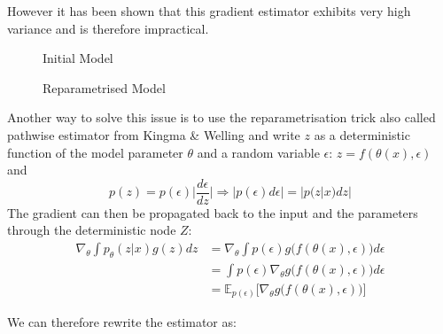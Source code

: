 \documentclass[10pt,oneside,openright]{report}
\begin{document}
However it has been shown that this gradient estimator exhibits very high variance and is therefore impractical.

\begin{figure}[H]
    \centering
    \begin{minipage}{0.45\textwidth}
        \centering
{}
        \caption{Initial Model}
    \end{minipage}\hfill
    \begin{minipage}{0.45\textwidth}
        \centering
{}
        \caption{Reparametrised Model}
    \end{minipage}
\end{figure}

Another way to solve this issue is to use the reparametrisation trick also called pathwise estimator  from Kingma \& Welling \cite{kingma} and write $z$ as a deterministic function of the model parameter $\theta$ and a random variable $\epsilon$: $z = f(\theta(x), \epsilon)$ and
$$p(z) = p(\epsilon) \Big|\frac{d\epsilon}{dz} \Big| \Rightarrow |p(\epsilon) d\epsilon| = |p(z|x) dz|$$
The gradient can then be propagated back to the input and the parameters through the deterministic node $Z$:
\begin{align}
\nabla_\theta \int p_\theta(z|x) g(z) dz &= \nabla_\theta \int p(\epsilon) g\big(f(\theta(x), \epsilon)\big) d\epsilon\\
&= \int p(\epsilon) \nabla_\theta g\big(f(\theta(x), \epsilon)\big) d\epsilon\\
&= \mathbb{E}_{p(\epsilon)}\Big[\nabla_\theta g\big(f(\theta(x), \epsilon)\big)\Big]
\end{align}

We can therefore rewrite the estimator as:
\end{document}
